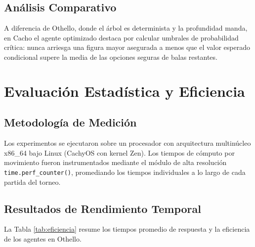 \documentclass[10pt,a4paper]{article}
\begin{document}
\subsection{Análisis Comparativo}
A diferencia de Othello, donde el árbol es determinista y la profundidad manda, en Cacho el agente optimizado destaca por calcular umbrales de probabilidad crítica: nunca arriesga una figura mayor asegurada a menos que el valor esperado condicional supere la media de las opciones seguras de balas restantes.

\section{Evaluación Estadística y Eficiencia}

\subsection{Metodología de Medición}
Los experimentos se ejecutaron sobre un procesador con arquitectura multinúcleo x86\_64 bajo Linux (CachyOS con kernel Zen). Los tiempos de cómputo por movimiento fueron instrumentados mediante el módulo de alta resolución \texttt{time.perf\_counter()}, promediando los tiempos individuales a lo largo de cada partida del torneo.

\subsection{Resultados de Rendimiento Temporal}
La Tabla \ref{tab:eficiencia} resume los tiempos promedio de respuesta y la eficiencia de los agentes en Othello.

\begin{table}[h]
    \centering
    \caption{Comparativa de eficiencia temporal por agente en Othello}
    \label{tab:eficiencia}
\end{table}
\end{document}
